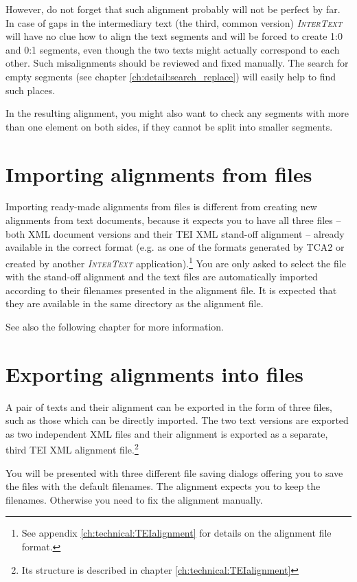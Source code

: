\documentclass[a4paper,10pt,oneside]{book}
\newcommand{\IT}{\textit{\textsc{InterText}}\xspace}
\begin{document}
However, do not forget that such alignment probably will not be perfect by far. In case of gaps in the intermediary text (the third, common version) \IT will have no clue how to align the text segments and will be forced to create 1:0 and 0:1 segments, even though the two texts might actually correspond to each other. Such misalignments should be reviewed and fixed manually. The search for empty segments (see chapter \ref{ch:detail:search_replace}) will easily help to find such places.

In the resulting alignment, you might also want to check any segments with more than one element on both sides, if they cannot be split into smaller segments.

\section{Importing alignments from files}\label{ch:detail:managing_local:import}

Importing ready-made alignments from files is different from creating new alignments from text documents, because it expects you to have all three files -- both XML document versions and their TEI XML stand-off alignment -- already available in the correct format (e.g. as one of the formats generated by TCA2 or created by another \IT application).\footnote{See appendix \ref{ch:technical:TEIalignment} for details on the alignment file format.} You are only asked to select the file with the stand-off alignment and the text files are automatically imported according to their filenames presented in the alignment file. It is expected that they are available in the same directory as the alignment file.

See also the following chapter for more information.

\section{Exporting alignments into files}\label{ch:detail:managing_local:export}

A pair of texts and their alignment can be exported in the form of three files, such as those which can be directly imported. The two text versions are exported as two independent XML files and their alignment is exported as a separate, third TEI XML alignment file.\footnote{Its structure is described in chapter \ref{ch:technical:TEIalignment}}

You will be presented with three different file saving dialogs offering you to save the files with the default filenames. The alignment expects you to keep the filenames. Otherwise you need to fix the alignment manually.
\end{document}
